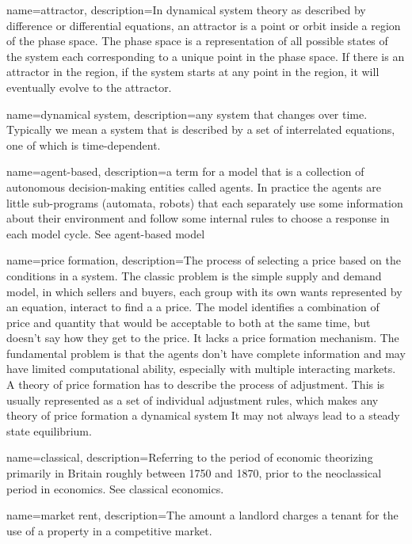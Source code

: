 {
name=attractor,
description={In \gls{dynamical system} theory as described by difference or differential equations, an attractor is a point or orbit inside a region of the phase space. The phase space is a representation of all possible states of the system each corresponding to a unique point in the phase space. If there is an attractor in the region, if the system starts at any point in the region,  it will eventually evolve to the attractor.}
}

{
name=dynamical system,
description={any system that changes over time. Typically we mean a  system that is described by a set of interrelated equations, one of which is time-dependent. }
}

{
name=agent-based,
description={a term for a model that is a  collection of autonomous decision-making entities called agents. In practice the agents are little sub-programs (automata, robots) that each separately use some information about their environment and follow some internal rules to choose a response in each model cycle. See \gls{agent-based model}}
}

{
name=price formation,
description={The process of selecting a price based on the conditions in a system. The classic problem is the simple supply and demand model, in which sellers and buyers, each group with its own wants represented by an equation, interact to find a a price. The model  identifies a combination of price and quantity that would be acceptable to both at the same time, but doesn't say how they get to the price. It lacks a price formation mechanism.  \newline The fundamental problem is that the agents don't have complete information and may have limited computational ability, especially with multiple interacting markets. A theory of price formation has to describe the process of adjustment. This is usually represented as a set of individual adjustment rules, which makes any theory of price formation a dynamical system It may not always lead to a steady state equilibrium.}
}

{
name=classical,
description={Referring to the period of economic theorizing primarily in Britain roughly between 1750 and 1870, prior to the neoclassical period in economics. See \gls{classical economics}.   }
}

{
name=market rent,
description={The amount a landlord charges a tenant for the use of a property in a competitive market. }
}

